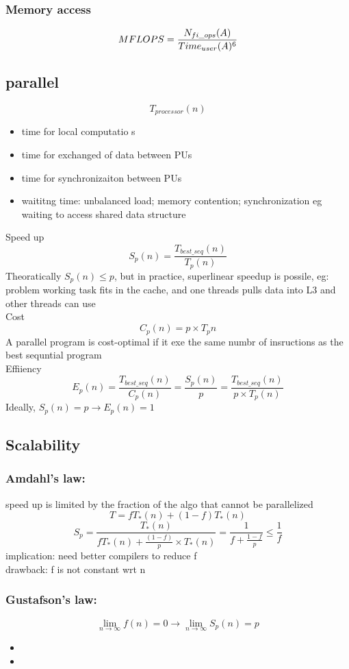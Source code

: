\documentclass{article}
\begin{document}
\subsubsection*{Memory access}

\[MFLOPS = \frac{N_{fi\_ops}(A)}{Time_{user}(A)\time 10^6}\]

\subsection{parallel}
\[T_{processor}(n)\]
\begin{itemize}
    \item time for local computatio s
    \item time for exchanged of data between PUs
    \item time for synchronizaiton between PUs
    \item waititng time: unbalanced load; memory contention; synchronization eg waiting to access shared data structure
\end{itemize}

Speed up
\[S_p(n) = \frac{T_{best\_seq}(n)}{T_p(n)}\]
Theoratically $S_p(n) \leq p$, but in practice, superlinear speedup is possile, eg: problem working task fits in the cache, and one threads pulls data into L3 and other threads can use\\
Cost
\[C_p(n) = p \times T_p{n}\]
A parallel program is cost-optimal if it exe the same numbr of insructions as the best sequntial program\\
Effiiency
\[E_p(n) = \frac{T_{best\_seq}(n)}{C_p(n)} = \frac{S_p(n)}{p} = \frac{T_{best\_seq}(n)}{p\times T_p(n)}\]
Ideally, $S_p(n) = p \rightarrow E_p(n) = 1$


\subsection{Scalability}
\subsubsection*{Amdahl's law: }
speed up is limited by the fraction of the algo that cannot be parallelized\\
\[T = fT_*(n) + (1-f)T_*(n)\]
\[S_p = \frac{T_*(n)}{fT_*(n) + \frac{(1-f)}{p}\times T_*(n)} = \frac{1}{f + \frac{1-f}{p}} \leq \frac{1}{f}\]
implication: need better compilers to reduce f\\
drawback: f is not constant wrt n\\
\subsubsection*{Gustafson's law:}
\[\lim_{n\rightarrow \infty} f(n) = 0 \rightarrow \lim_{n\rightarrow \infty} S_p(n) = p\]
\begin{itemize}
    \item 
    \item 
\end{itemize}
\end{document}
